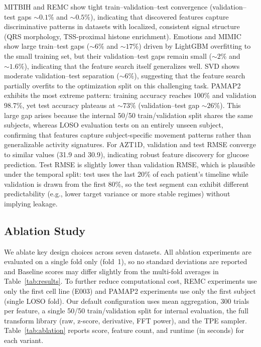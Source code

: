 \documentclass[times, review, 10pt]{elsarticle}
\begin{document}
MITBIH and REMC show tight train--validation--test convergence
(validation--test gaps ${\sim}0.1\%$ and ${\sim}0.5\%$),
indicating that discovered features capture
discriminative patterns in datasets with localized,
consistent signal structure (QRS morphology, TSS-proximal
histone enrichment).
Emotions and MIMIC show large train--test gaps
(${\sim}6\%$ and ${\sim}17\%$) driven by LightGBM overfitting
to the small training set, but their validation--test gaps
remain small (${\sim}2\%$ and ${\sim}1.6\%$), indicating
that the feature search itself generalizes well.
SVD shows moderate validation--test separation
(${\sim}6\%$), suggesting that the feature search partially
overfits to the optimization split on this challenging task.
PAMAP2 exhibits the most extreme pattern: training accuracy
reaches 100\% and validation 98.7\%, yet test accuracy
plateaus at ${\sim}73\%$ (validation--test gap
${\sim}26\%$). This large gap arises because the internal
50/50 train/validation split shares the same subjects,
whereas LOSO evaluation tests on an entirely unseen subject,
confirming that features capture
subject-specific movement patterns rather than
generalizable activity signatures.
For AZT1D, validation and test RMSE converge
to similar values (31.9 and 30.9), indicating robust feature
discovery for glucose prediction. Test RMSE is slightly lower than
validation RMSE, which is plausible under the temporal split: test
uses the last 20\% of each patient's timeline while validation is
drawn from the first 80\%, so the test segment can exhibit different
predictability (e.g., lower target variance or more stable regimes)
without implying leakage.

\subsection{Ablation Study}

We ablate key design choices across seven datasets.
All ablation experiments are evaluated on a single fold
only (fold~1), so no standard deviations are reported and
Baseline scores may differ slightly from the multi-fold
averages in Table~\ref{tab:results}.
To further reduce computational cost, REMC experiments
use only the first cell line (E003) and PAMAP2 experiments
use only the first subject (single LOSO fold).
Our default configuration uses mean aggregation, 300 trials
per feature, a single 50/50 train/validation split for
internal evaluation, the full transform library (raw,
z-score, derivative, FFT power), and the TPE sampler.
Table~\ref{tab:ablation} reports score, feature count,
and runtime (in seconds) for each variant.
\end{document}

